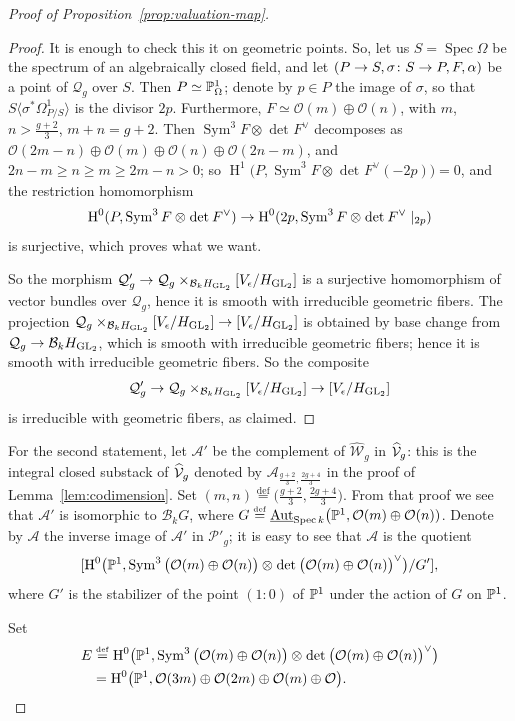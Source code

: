 \documentclass{amsart}
\numberwithin{equation}{section}
\numberwithin{subsection}{section}
\theoremstyle{definition}
\theoremstyle{remark}
\newcommand\cA{\mathcal{A}} \newcommand\cB{\mathcal{B}}
\newcommand\cO{\mathcal{O}} \newcommand\cP{\mathcal{P}}
\newcommand\cQ{\mathcal{Q}} \newcommand\cR{\mathcal{R}}
\newcommand\cW{\mathcal{W}} \newcommand\cX{\mathcal{X}}
\newcommand\arr{\ifinner\to\else\longrightarrow\fi}
\renewcommand\H{\operatorname{H}}
\newcommand\eqdef{\overset{\mathrm{\scriptscriptstyle def}} =}
\newcommand\spec{\operatorname{Spec}}
\newcommand\generate[1]{\langle #1 \rangle}
\newcommand{\underaut}
{\mathop{\underline{\mathrm{Aut}}}\nolimits}
\newcommand{\GL}{\mathrm{GL}}
\newcommand{\sym}{\operatorname{Sym}}
\newcommand{\symthree}[2][]{\sym^{3}_{{#1}}{#2} \otimes_{{#1}} \det\nolimits_{{#1}} {#2}\dual}
\newcommand{\dual}{^{\vee}}
\newcommand\Hg{H_{\GL_2}}
\newcommand\Ve{V_{\epsilon}}
\begin{document}
\begin{proof}[Proof of Proposition~\ref{prop:valuation-map}]
\begin{proof}
It is enough to check this it on geometric points. So, let us $S = \spec \Omega$ be the spectrum of an algebraically closed field, and let $(P\to S, \sigma\colon S \arr P, F, \alpha)$ be a point of $\cQ_{g}$ over $S$. Then $P \simeq \mathbb{P}^{1}_{\Omega}$; denote by $p \in P$ the image of $\sigma$, so that $S\generate{\sigma^{*}\Omega^{1}_{P/S}}$ is the divisor $2p$. Furthermore, $F \simeq \cO(m) \oplus \cO(n)$, with $m$, $n > \frac{g+2}{3}$, $m+n = g+2$. Then $\symthree{F}$ decomposes as $\cO(2m-n)\oplus \cO(m) \oplus \cO(n) \oplus \cO(2n-m)$, and $2n-m \geq n \geq m \geq 2m-n >0$; so $\H^{1}\bigl(P, \symthree{F}(-2p)\bigr) = 0$, and the restriction homomorphism
   \[
   \H^{0}(P, \symthree{F}) \arr \H^{0}(2p, \symthree{F}\mid_{2p})
   \]
is surjective, which proves what we want.

So the morphism $\cQ'_{g} \arr \cQ_{g}\times_{\cB_{k}\Hg}[\Ve/\Hg]$ is a surjective homomorphism of vector bundles over $\cQ_{g}$, hence it is smooth with irreducible geometric fibers. The projection $\cQ_{g}\times_{\cB_{k}\Hg}[\Ve/\Hg] \arr [\Ve/\Hg]$ is obtained by base change from $\cQ_{g} \arr \cB_{k}\Hg$, which is smooth with irreducible geometric fibers; hence it is smooth with irreducible geometric fibers. So the composite
   \[
   \cQ'_{g} \arr \cQ_{g}\times_{\cB_{k}\Hg}[\Ve/\Hg]
      \arr [\Ve/\Hg]
   \]
is irreducible with geometric fibers, as claimed.
\end{proof}


For the second statement, let $\cA'$ be the complement of $\widehat{\cW}_{g}$ in $\widehat{\mathcal{V}}_{g}$: this is the integral closed substack of $\widehat{\mathcal{V}}_{g}$ denoted by $\cA_{\frac{g+2}{3}, \frac{2g+4}{3}}$ in the proof of Lemma~\ref{lem:codimension}. Set $(m, n) \eqdef \bigl(\frac{g+2}{3}, \frac{2g+4}{3}\bigr)$. From that proof we see that $\cA'$ is isomorphic to $\cB_{k}G$, where $G \eqdef \underaut_{\spec k}\bigl(\PP^{1}, \cO(m)\oplus \cO(n))$. Denote by $\cA$ the inverse image of $\cA'$ in $\cP'_{g}$; it is easy to see that $\cA$ is the quotient
   \[
   [\H^{0}\bigl(\PP^{1},
      \symthree{\bigl(\cO(m) \oplus \cO(n)\bigr)}\bigr)/G'],
   \]
where $G'$ is the stabilizer of the point $(1:0)$ of $\mathbb{P}^{1}$ under the action of $G$ on $\mathbb{P}^{1}$. 

Set
   \begin{align*}
   E &\eqdef \H^{0}\bigl(\PP^{1},
      \symthree{\bigl(\cO(m) \oplus \cO(n)\bigr)}\bigr)\\
   &= \H^{0}\bigl(\PP^{1}, \cO(3m) \oplus \cO(2m) \oplus \cO(m)
      \oplus \cO\bigr).
   \end{align*}


\end{proof}
\end{document}
